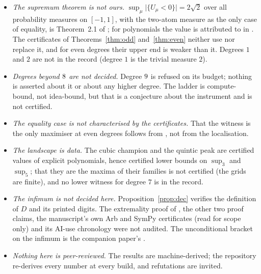 \documentclass[11pt]{article}
\newcommand{\meas}[1]{\lvert #1 \rvert}
\begin{document}
\begin{itemize}
\item \emph{The supremum theorem is not ours.} $\sup_\mu\meas{\{U_\mu<0\}}=2\sqrt2$ over all
probability measures on $[-1,1]$, with the two-atom measure as the only case of equality, is
Theorem~2.1 of \cite{TaoNotes}; for polynomials the value is attributed to \cite{El66,El68} in
\cite{DPT}. The certificates of Theorems~\ref{thm:odd} and~\ref{thm:even} neither use nor
replace it, and for even degrees their upper end is weaker than it. Degrees $1$ and $2$ are not
in the record (degree $1$ is the trivial measure $2$).
\item \emph{Degrees beyond $8$ are not decided.} Degree $9$ is refused on
its budget; nothing is asserted about it or about any higher degree. The ladder is compute-bound,
not idea-bound, but that is a conjecture about the instrument and is not certified.
\item \emph{The equality case is not characterised by the certificates.} That the witness is
the only maximiser at even degrees follows from \cite{TaoNotes}, not from the localisation.
\item \emph{The landscape is data.} The cubic champion and the quintic peak are certified
values of explicit polynomials, hence certified lower bounds on $\sup_3$ and $\sup_5$; that they
are the maxima of their families is not certified (the grids are finite), and no lower witness
for degree $7$ is in the record.
\item \emph{The infimum is not decided here.} Proposition~\ref{prop:dec} verifies the
definition of $D$ and its printed digits. The extremality proof of \cite{DPT}, the other two
proof claims, the manuscript's own Arb and SymPy certificates (read for scope only) and its
AI-use chronology were not audited. The unconditional bracket on the infimum is the companion
paper's \cite{Companion}.
\item \emph{Nothing here is peer-reviewed.} The results are machine-derived; the repository
re-derives every number at every build, and refutations are invited.
\end{itemize}
\end{document}
